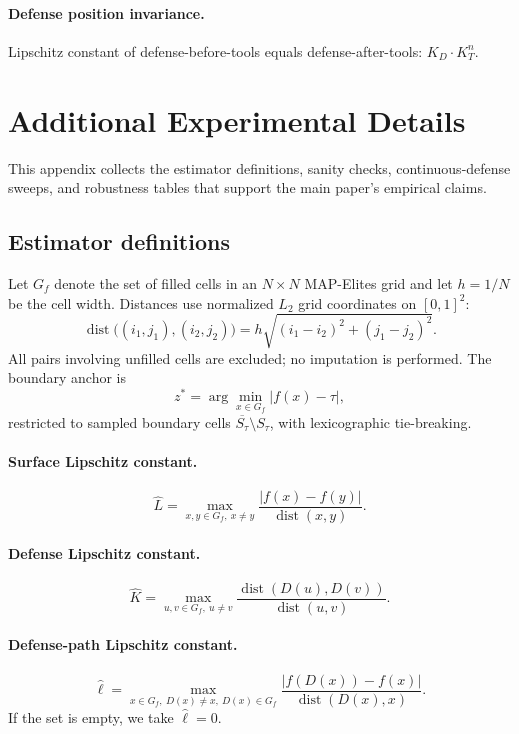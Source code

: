 \documentclass[11pt]{article}
\newcommand{\cl}[1]{\overline{#1}}
\newcommand{\dist}{\operatorname{dist}}
\begin{document}
\paragraph{Defense position invariance.}
Lipschitz constant of defense-before-tools equals defense-after-tools:
$K_D \cdot K_T^n$.


\section{Additional Experimental Details}
\label{app:exp-details}

This appendix collects the estimator definitions, sanity checks,
continuous-defense sweeps, and robustness tables that support the main
paper's empirical claims.

\subsection{Estimator definitions}
\label{sec:estimators}

Let $G_f$ denote the set of filled cells in an $N \times N$ MAP-Elites
grid and let $h = 1/N$ be the cell width. Distances use normalized
$L_2$ grid coordinates on $[0,1]^2$:
\[
\dist\bigl((i_1,j_1),(i_2,j_2)\bigr)
  = h\sqrt{(i_1-i_2)^2 + (j_1-j_2)^2}.
\]
All pairs involving unfilled cells are excluded; no imputation is
performed. The boundary anchor is
\[
z^* = \arg\min_{x \in G_f} |f(x)-\tau|,
\]
restricted to sampled boundary cells
$\cl{S_\tau}\setminus S_\tau$, with lexicographic tie-breaking.

\paragraph{Surface Lipschitz constant.}
\[
\hat L = \max_{x,y \in G_f,\ x \neq y}
\frac{|f(x)-f(y)|}{\dist(x,y)}.
\]

\paragraph{Defense Lipschitz constant.}
\[
\hat K = \max_{u,v \in G_f,\ u \neq v}
\frac{\dist(D(u),D(v))}{\dist(u,v)}.
\]

\paragraph{Defense-path Lipschitz constant.}
\[
\hat\ell = \max_{x \in G_f,\ D(x)\neq x,\ D(x)\in G_f}
\frac{|f(D(x))-f(x)|}{\dist(D(x),x)}.
\]
If the set is empty, we take $\hat\ell = 0$.
\end{document}
